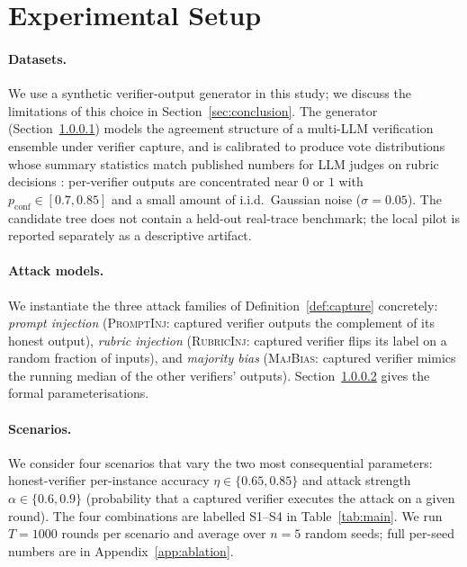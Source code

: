 \documentclass[11pt]{article}
\begin{document}
\section{Experimental Setup}
\label{sec:exp}

\paragraph{Datasets.}
\label{sub:generator}
We use a synthetic verifier-output generator in this study; we discuss
the limitations of this choice in Section~\ref{sec:conclusion}. The
generator (Section~\ref{sub:generator}) models the agreement structure
of a multi-LLM verification ensemble under verifier capture, and is
calibrated to produce vote distributions whose summary statistics
match published numbers for LLM judges on rubric decisions
\citep{leung2026rubricllm}: per-verifier outputs are concentrated
near $0$ or $1$ with $p_{\text{conf}} \in [0.7, 0.85]$ and a small
amount of i.i.d.\ Gaussian noise ($\sigma = 0.05$). The candidate tree does
not contain a held-out real-trace benchmark; the local pilot is reported
separately as a descriptive artifact.

\paragraph{Attack models.}
\label{sub:attacks}
We instantiate the three attack families of
Definition~\ref{def:capture} concretely: \emph{prompt injection}
(\textsc{PromptInj}: captured verifier outputs the complement of its
honest output), \emph{rubric injection}
(\textsc{RubricInj}: captured verifier flips its label on a random
fraction of inputs), and \emph{majority bias}
(\textsc{MajBias}: captured verifier mimics the running median of the
other verifiers' outputs). Section~\ref{sub:attacks} gives the formal
parameterisations.

\paragraph{Scenarios.}
We consider four scenarios that vary the two most consequential
parameters: honest-verifier per-instance accuracy $\eta \in \{0.65,
0.85\}$ and attack strength $\alpha \in \{0.6, 0.9\}$ (probability
that a captured verifier executes the attack on a given round). The
four combinations are labelled S1--S4 in
Table~\ref{tab:main}. We run $T = 1000$ rounds per scenario and
average over $n = 5$ random seeds; full per-seed numbers are in
Appendix~\ref{app:ablation}.
\end{document}
